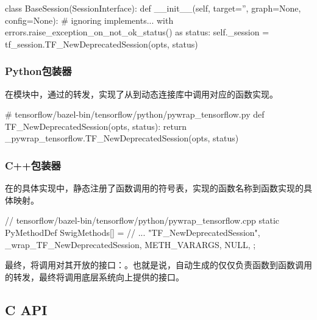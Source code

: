 \begin{content}
\begin{leftbar}
\begin{python}
class BaseSession(SessionInterface):
  def __init__(self, target='', graph=None, config=None):
    # ignoring implements...
    with errors.raise_exception_on_not_ok_status() as status:
        self._session = tf_session.TF_NewDeprecatedSession(opts, status)
\end{python}
\end{leftbar}

\subsubsection{Python包装器}

在模块中，通过的转发，实现了从到动态连接库中调用对应的\cpp{}函数实现。

\begin{leftbar}
\begin{python}
# tensorflow/bazel-bin/tensorflow/python/pywrap\_tensorflow.py
def TF_NewDeprecatedSession(opts, status):
    return _pywrap_tensorflow.TF_NewDeprecatedSession(opts, status)
\end{python}
\end{leftbar}

\subsubsection{C++包装器}

在的具体实现中，静态注册了函数调用的符号表，实现的函数名称到\cpp{}函数实现的具体映射。

\begin{leftbar}
\begin{c++}
// tensorflow/bazel-bin/tensorflow/python/pywrap\_tensorflow.cpp
static PyMethodDef SwigMethods[] = {
   // ...
  { "TF_NewDeprecatedSession", 
    _wrap_TF_NewDeprecatedSession, METH_VARARGS, NULL},
};
\end{c++}
\end{leftbar}

最终，将调用对其开放的接口：。也就是说，自动生成的仅仅负责函数到函数调用的转发，最终将调用底层系统向上提供的接口。

\subsection{C API}


\end{content}
